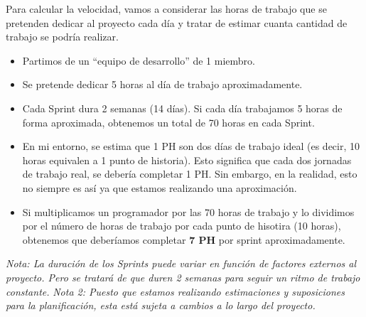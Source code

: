 Para calcular la velocidad, vamos a considerar las horas de trabajo que se pretenden dedicar al proyecto cada día y tratar
de estimar cuanta cantidad de trabajo se podría realizar.

\begin{itemize}
    \item Partimos de un ``equipo de desarrollo'' de 1 miembro.
    \item Se pretende dedicar 5 horas al día de trabajo aproximadamente.
    \item Cada Sprint dura 2 semanas (14 días). Si cada día trabajamos 5 horas de forma aproximada, obtenemos un total de 70 horas
          en cada Sprint.
    \item En mi entorno, se estima que 1 PH son dos días de trabajo ideal (es decir, 10 horas equivalen a 1 punto de historia).
    Esto significa que cada dos jornadas de trabajo real, se debería completar 1 PH. Sin embargo, en la realidad, esto no siempre 
    es así ya que estamos realizando una aproximación.
    \item Si multiplicamos un programador por las 70 horas de trabajo y lo dividimos por el número de horas de trabajo por cada punto de hisotira
    (10 horas), obtenemos que deberíamos completar \textbf{7 PH} por sprint aproximadamente.
\end{itemize}

\textit{Nota: La duración de los Sprints puede variar en función de factores externos al proyecto. Pero se tratará de que duren 
2 semanas para seguir un ritmo de trabajo constante.}
\textit{Nota 2: Puesto que estamos realizando estimaciones y suposiciones para la planificación, esta está sujeta a cambios a 
lo largo del proyecto.}

